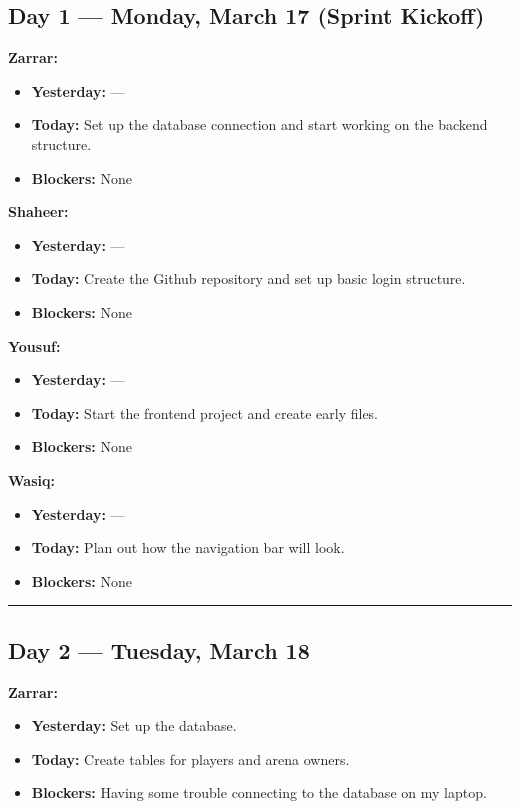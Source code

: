 \documentclass[12pt,a4paper]{article}
\begin{document}
\subsection*{Day 1 --- Monday, March 17 (Sprint Kickoff)}

\textbf{Zarrar:}
\begin{itemize}[noitemsep]
    \item \textbf{Yesterday:} ---
    \item \textbf{Today:} Set up the database connection and start working on the backend structure.
    \item \textbf{Blockers:} None
\end{itemize}

\textbf{Shaheer:}
\begin{itemize}[noitemsep]
    \item \textbf{Yesterday:} ---
    \item \textbf{Today:} Create the Github repository and set up basic login structure.
    \item \textbf{Blockers:} None
\end{itemize}

\textbf{Yousuf:}
\begin{itemize}[noitemsep]
    \item \textbf{Yesterday:} ---
    \item \textbf{Today:} Start the frontend project and create early files.
    \item \textbf{Blockers:} None
\end{itemize}

\textbf{Wasiq:}
\begin{itemize}[noitemsep]
    \item \textbf{Yesterday:} ---
    \item \textbf{Today:} Plan out how the navigation bar will look.
    \item \textbf{Blockers:} None
\end{itemize}

\vspace{1em}
\hrule
\vspace{1em}

\subsection*{Day 2 --- Tuesday, March 18}

\textbf{Zarrar:}
\begin{itemize}[noitemsep]
    \item \textbf{Yesterday:} Set up the database.
    \item \textbf{Today:} Create tables for players and arena owners.
    \item \textbf{Blockers:} Having some trouble connecting to the database on my laptop.
\end{itemize}
\end{document}

